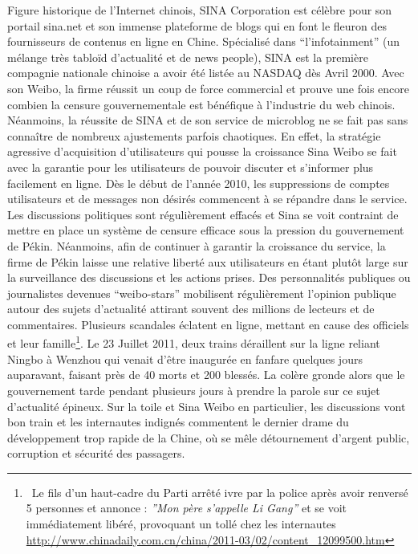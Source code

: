 {\color{black}
Figure historique de l'Internet chinois, SINA Corporation est c\'el\`ebre pour son portail sina.net et son immense
plateforme de blogs qui en font le fleuron des fournisseurs de contenus en ligne en Chine. Sp\'ecialis\'e dans
``l'infotainment'' (un m\'elange tr\`es tablo\"id d'actualit\'e et de news people), SINA est la premi\`ere compagnie
nationale chinoise a avoir \'et\'e list\'ee au NASDAQ d\`es Avril 2000. Avec son Weibo, la firme r\'eussit un coup de
force commercial et prouve une fois encore combien la censure gouvernementale est b\'en\'efique \`a l'industrie du web
chinois. N\'eanmoins, la r\'eussite de SINA et de son service de microblog ne se fait pas sans conna\^itre de nombreux
ajustements parfois chaotiques. En effet, la strat\'egie agressive d'acquisition d'utilisateurs qui pousse la
croissance Sina Weibo se fait avec la garantie pour les utilisateurs de pouvoir discuter et s'informer plus facilement
en ligne. D\`es le d\'ebut de l'ann\'ee 2010, les suppressions de comptes utilisateurs et de messages non d\'esir\'es
commencent \`a se r\'epandre dans le service. Les discussions politiques sont r\'eguli\`erement effac\'es et Sina se
voit contraint de mettre en place un syst\`eme de censure efficace sous la pression du gouvernement de P\'ekin.
N\'eanmoins, afin de continuer \`a garantir la croissance du service, la firme de P\'ekin laisse une relative libert\'e
aux utilisateurs en \'etant plut\^ot large sur la surveillance des discussions et les actions prises. Des
personnalit\'es publiques ou journalistes devenues ``weibo-stars'' mobilisent r\'eguli\`erement l'opinion publique
autour des sujets d'actualit\'e attirant souvent des millions de lecteurs et de commentaires. Plusieurs scandales
\'eclatent en ligne, mettant en cause des officiels et leur famille\footnote{\ Le fils d'un haut-cadre du Parti
arr\^et\'e ivre par la police apr\`es avoir renvers\'e 5 personnes et annonce : \textit{{}''Mon p\`ere s'appelle Li
Gang'' }et se voit imm\'ediatement lib\'er\'e, provoquant un toll\'e chez les internautes
\url{http://www.chinadaily.com.cn/china/2011-03/02/content_12099500.htm}}. Le 23 Juillet 2011, deux trains d\'eraillent
sur la ligne reliant Ningbo \`a Wenzhou qui venait d'\^etre inaugur\'ee en fanfare quelques jours auparavant, faisant
pr\`es de 40 morts et 200 bless\'es. La col\`ere gronde alors que le gouvernement tarde pendant plusieurs jours \`a
prendre la parole sur ce sujet d'actualit\'e \'epineux. Sur la toile et Sina Weibo en particulier, les discussions vont
bon train et les internautes indign\'es commentent le dernier drame du d\'eveloppement trop rapide de la Chine, o\`u se
m\^ele d\'etournement d'argent public, corruption et s\'ecurit\'e des passagers. }


